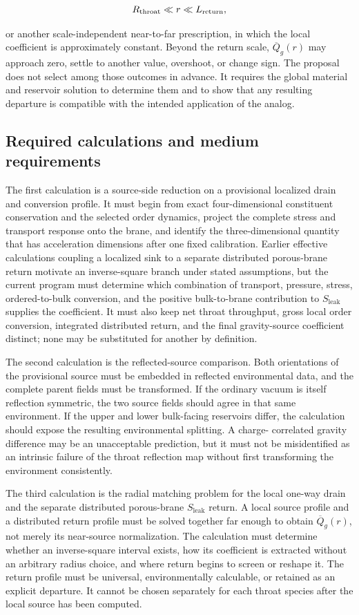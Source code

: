 \[
R_{\rm throat}\ll r\ll L_{\rm return},
\]

or another scale-independent near-to-far prescription, in which the local
coefficient is approximately constant. Beyond the return scale,
\(\overline Q_g(r)\) may approach zero, settle to another value, overshoot, or
change sign. The proposal does not select among those outcomes in advance. It
requires the global material and reservoir solution to determine them and to
show that any resulting departure is compatible with the intended application
of the analog.

\subsection{Required calculations and medium requirements}

The first calculation is a source-side reduction on a provisional localized
drain and conversion profile. It must begin from exact four-dimensional
constituent conservation and the selected order dynamics, project the complete
stress and transport response onto the brane, and identify the three-dimensional
quantity that has acceleration dimensions after one fixed calibration. Earlier
effective calculations coupling a localized sink to a separate distributed
porous-brane return motivate an inverse-square branch under stated assumptions,
but the current program must determine which combination of transport, pressure,
stress, ordered-to-bulk conversion, and the positive bulk-to-brane contribution
to \(S_{\mathrm{leak}}\) supplies the coefficient. It must also keep net throat
throughput, gross local order conversion, integrated distributed return, and the
final gravity-source coefficient distinct; none may be substituted for another
by definition.

The second calculation is the reflected-source comparison. Both orientations
of the provisional source must be embedded in reflected environmental data, and
the complete parent fields must be transformed. If the ordinary vacuum is
itself reflection symmetric, the two source fields should agree in that same
environment. If the upper and lower bulk-facing reservoirs differ, the
calculation should expose the resulting environmental splitting. A charge-
correlated gravity difference may be an unacceptable prediction, but it must
not be misidentified as an intrinsic failure of the throat reflection map
without first transforming the environment consistently.

The third calculation is the radial matching problem for the local one-way drain
and the separate distributed porous-brane \(S_{\mathrm{leak}}\) return. A local
source profile and a distributed return profile must be solved together far
enough to obtain \(\overline Q_g(r)\), not merely its near-source normalization. The
calculation must determine whether an inverse-square interval exists, how its
coefficient is extracted without an arbitrary radius choice, and where return
begins to screen or reshape it. The return profile must be universal,
environmentally calculable, or retained as an explicit departure. It cannot be
chosen separately for each throat species after the local source has been
computed.

